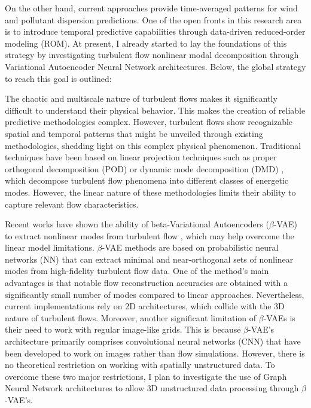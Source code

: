 \documentclass{article}
\begin{document}
On the other hand, current approaches provide time-averaged patterns for wind and pollutant dispersion predictions. One of the open fronts in this research area is to introduce temporal predictive capabilities through data-driven reduced-order modeling (ROM). At present, I already started to lay the foundations of this strategy by investigating turbulent flow nonlinear modal decomposition through Variational Autoencoder Neural Network architectures. Below, the global strategy to reach this goal is outlined: 

The chaotic and multiscale nature of turbulent flows makes it significantly difficult to understand their physical behavior. This makes the creation of reliable predictive methodologies complex. However, turbulent flows show recognizable spatial and temporal patterns that might be unveiled through existing methodologies, shedding light on this complex physical phenomenon. Traditional techniques have been based on linear projection techniques such as proper orthogonal decomposition (POD) or dynamic mode decomposition (DMD) \cite{EIX22}, which decompose turbulent flow phenomena into different classes of energetic modes. However, the linear nature of these methodologies limits their ability to capture relevant flow characteristics. 

Recent works have shown the ability of beta-Variational Autoencoders ($\beta$-VAE) to extract nonlinear modes from turbulent flow \cite{EIV22}, which may help overcome the linear model limitations. $\beta$-VAE methods are based on probabilistic neural networks (NN) that can extract minimal and near-orthogonal sets of nonlinear modes from high-fidelity turbulent flow data. One of the method's main advantages is that notable flow reconstruction accuracies are obtained with a significantly small number of modes compared to linear approaches. Nevertheless, current implementations rely on 2D architectures, which collide with the 3D nature of turbulent flows. Moreover, another significant limitation of $\beta$-VAEs is their need to work with regular image-like grids. This is because $\beta$-VAE's architecture primarily comprises convolutional neural networks (CNN) that have been developed to work on images rather than flow simulations. However, there is no theoretical restriction on working with spatially unstructured data. To overcome these two major restrictions, I plan to investigate the use of Graph Neural Network architectures to allow 3D unstructured data processing through $\beta$-VAE's.
\end{document}
